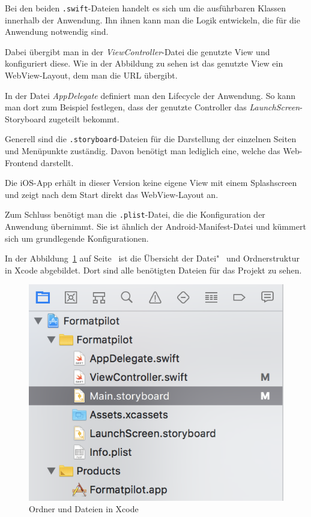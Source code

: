 Bei den beiden \texttt{.swift}-Dateien handelt es sich um die ausführbaren Klassen innerhalb der Anwendung. Ihn ihnen
kann man die Logik entwickeln, die für die Anwendung notwendig sind.

Dabei übergibt man in der \textit{ViewController}-Datei die genutzte View und konfiguriert diese. Wie in der Abbildung
zu sehen ist das genutzte View ein WebView-Layout, dem man die URL übergibt.

In der Datei \textit{AppDelegate} definiert man den Lifecycle der Anwendung. So kann man dort zum Beispiel festlegen,
dass der genutzte Controller das \textit{LaunchScreen}-Storyboard zugeteilt bekommt.

Generell sind die \texttt{.storyboard}-Dateien für die Darstellung der einzelnen Seiten und Menüpunkte zuständig. Davon
benötigt man lediglich eine, welche das Web-Frontend darstellt.

Die iOS-App erhält in dieser Version keine eigene View mit einem Splashscreen und zeigt nach dem Start direkt das
WebView-Layout an.

Zum Schluss benötigt man die \texttt{.plist}-Datei, die die Konfiguration der Anwendung übernimmt. Sie ist ähnlich der
Android-Manifest-Datei und kümmert sich um grundlegende Konfigurationen.

In der Abbildung~\ref{fig:umsetzung_ios_folder} auf Seite~\pageref{fig:umsetzung_ios_folder} ist die Übersicht der
Datei"~ und Ordnerstruktur in Xcode abgebildet. Dort sind alle benötigten Dateien für das Projekt zu sehen.

\begin{figure}[h]
    \centering
    \includegraphics[scale=0.6]{images/kapitel_4/ios_folder.png}
    \caption{Ordner und Dateien in Xcode}
    \label{fig:umsetzung_ios_folder}
\end{figure}

